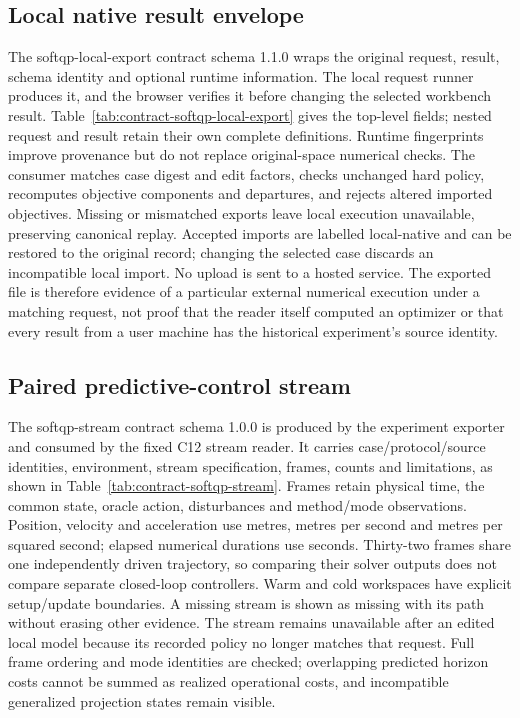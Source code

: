 \subsection{Local native result envelope}\label{sec:contract-softqp-local-export}
The softqp-local-export contract schema 1.1.0 wraps the original request,
result, schema identity and optional runtime information. The local request
runner produces it, and the browser verifies it before changing the selected
workbench result. Table~\ref{tab:contract-softqp-local-export} gives the top-level
fields; nested request and result retain their own complete definitions.
Runtime fingerprints improve provenance but do not replace original-space
numerical checks. The consumer matches case digest and edit factors, checks
unchanged hard policy, recomputes objective components and departures, and
rejects altered imported objectives. Missing or mismatched exports leave
local execution unavailable, preserving canonical replay. Accepted imports
are labelled local-native and can be restored to the original record; changing
the selected case discards an incompatible local import. No upload is sent
to a hosted service. The exported file is therefore evidence of a particular
external numerical execution under a matching request, not proof that the
reader itself computed an optimizer or that every result from a user machine
has the historical experiment's source identity.


\subsection{Paired predictive-control stream}\label{sec:contract-softqp-stream}
The softqp-stream contract schema 1.0.0 is produced by the experiment exporter
and consumed by the fixed C12 stream reader. It carries case/protocol/source
identities, environment, stream specification, frames, counts and limitations,
as shown in Table~\ref{tab:contract-softqp-stream}. Frames retain physical time,
the common state, oracle action, disturbances and method/mode observations.
Position, velocity and acceleration use metres, metres per second and metres
per squared second; elapsed numerical durations use seconds. Thirty-two
frames share one independently driven trajectory, so comparing their solver
outputs does not compare separate closed-loop controllers. Warm and cold
workspaces have explicit setup/update boundaries. A missing stream is shown
as missing with its path without erasing other evidence. The stream remains
unavailable after an edited local model because its recorded policy no longer
matches that request. Full frame ordering and mode identities are checked;
overlapping predicted horizon costs cannot be summed as realized operational
costs, and incompatible generalized projection states remain visible.


